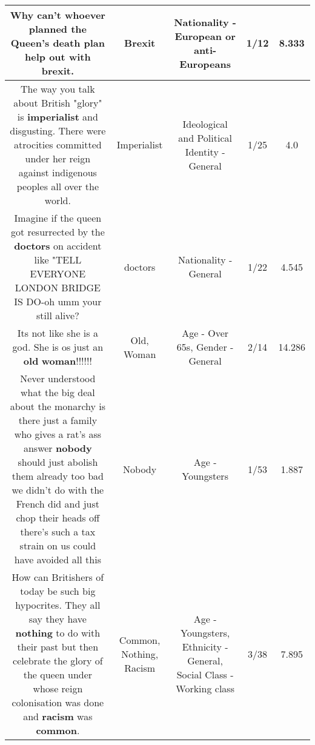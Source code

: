 \documentclass[11pt]{article}
\newlength\mylength
\begin{document}
\begin{center}
\begin{longtable}{|C{.65\mylength}|C{.30\mylength}|C{.12\mylength}|C{.12\mylength}|C{.12\mylength}|}
  \small Why can't whoever planned the Queen's death plan help out with \textbf{brexit}.\normalsize   & Brexit & Nationality - European or anti-Europeans & 1/12 & 8.333 \\  \hline
  \small The way you talk about British "glory" is \textbf{imperialist} and disgusting. There were atrocities committed under her reign against indigenous peoples all over the world.\normalsize   & Imperialist &  Ideological and Political Identity - General & 1/25 & 4.0 \\  \hline
  \small Imagine if the queen got resurrected by the \textbf{doctors} on accident like "TELL EVERYONE LONDON BRIDGE IS DO-oh umm your still alive?\normalsize   & doctors & Nationality - General & 1/22 & 4.545 \\  \hline
  \small Its not like she is a god. She is os just an \textbf{old} \textbf{woman}!!!!!!\normalsize   & Old, Woman & Age - Over 65s, Gender - General & 2/14 & 14.286 \\  \hline
  \small Never understood what the big deal about the monarchy is there just a family who gives a rat's ass answer \textbf{nobody} should just abolish them already too bad we didn't do with the French did and just chop their heads off there's such a tax strain on us could have avoided all this\normalsize   & Nobody & Age - Youngsters & 1/53 & 1.887 \\  \hline
  \small How can Britishers of today be such big hypocrites. They all say they have \textbf{nothing} to do with their past but then celebrate the glory of the queen under whose reign colonisation was done and \textbf{racism} was \textbf{common}.\normalsize   & Common, Nothing, Racism & Age - Youngsters, Ethnicity - General, Social Class - Working class & 3/38 & 7.895 \\  \hline

\end{longtable}
\end{center}
\end{document}
